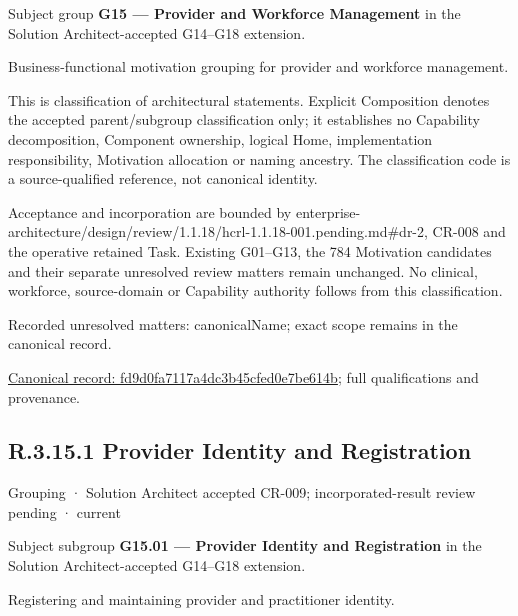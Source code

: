 Subject group \textbf{G15 — Provider and Workforce Management} in the Solution Architect-accepted G14–G18 extension.



Business-functional motivation grouping for provider and workforce management.



This is classification of architectural statements. Explicit Composition denotes the accepted parent/subgroup classification only; it establishes no Capability decomposition, Component ownership, logical Home, implementation responsibility, Motivation allocation or naming ancestry. The classification code is a source-qualified reference, not canonical identity.



Acceptance and incorporation are bounded by enterprise-architecture/design/review/1.1.18/hcrl-1.1.18-001.pending.md\#dr-2, CR-008 and the operative retained Task. Existing G01–G13, the 784 Motivation candidates and their separate unresolved review matters remain unchanged. No clinical, workforce, source-domain or Capability authority follows from this classification.


{\small Recorded unresolved matters: canonicalName; exact scope remains in the canonical record.}\par
{\footnotesize \href{../../../../continuum/grouping/fd9d0fa7117a4dc3b45cfed0e7be614b.md}{Canonical record: fd9d0fa7117a4dc3b45cfed0e7be614b}; full qualifications and provenance.}\par
\subsection*{R.3.15.1 Provider Identity and Registration}
\label{navigation:R.3.15.1}

\label{element:a58e87c95bd24c16a1006b217aeac691}
{\small Grouping · Solution Architect accepted CR-009; incorporated-result review pending · current}\par

Subject subgroup \textbf{G15.01 — Provider Identity and Registration} in the Solution Architect-accepted G14–G18 extension.



Registering and maintaining provider and practitioner identity.



